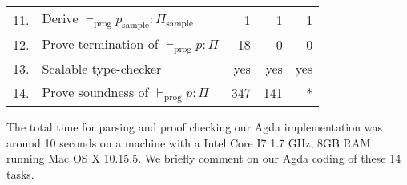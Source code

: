 \documentclass[sigconf]{acmart}
\theoremstyle{definition}
\begin{document}
\begin{table}[!htb]
\begin{tabular}{rl|rrr}
11. & Derive $\vdash_{\textrm{prog}} p_{\textrm{sample}} : \Pi_{\textrm{sample}}$
                                                   & 1                         & 1                       & 1                        \\
12. & Prove termination of $\vdash_{\textrm{prog}} p : \Pi$
                                                   & 18                        & 0                       & 0                        \\
13. & Scalable type-checker                        & yes                       & yes                     & yes                      \\
14. & Prove soundness of $\vdash_{\textrm{prog}} p : \Pi$
                                                   & 347                       & 141                     & * 
\end{tabular}
\end{table}

The total time for parsing and proof checking our Agda implementation was around 10 seconds 
on a machine with a Intel Core I7 1.7 GHz, 8GB RAM running Mac OS X 10.15.5. We briefly comment 
on our Agda coding of these 14 tasks.
\end{document}
